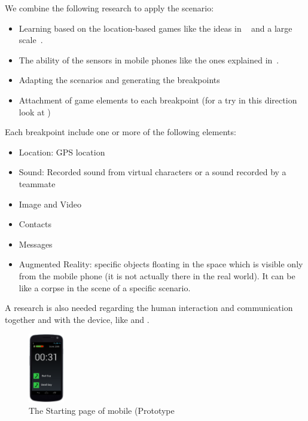 \documentclass[conference]{IEEEtran}
\begin{document}
We combine the following research to apply the scenario:
\begin{itemize}
\item Learning based on the location-based games like the ideas in ~\cite{rexplorer} and 
a large scale~\cite{scal-loc-g}.
\item The ability of the sensors in mobile phones like the ones explained in~\cite{sensors}.
\item Adapting the scenarios and generating the breakpoints
\item Attachment of game elements to each breakpoint (for a try in this direction 
look at \cite{totem})
\end{itemize}


Each breakpoint include one or more of the following elements:
\begin{itemize}
\item Location: GPS location
\item Sound: Recorded sound from virtual characters or a sound
recorded by a teammate
\item Image and Video
\item Contacts
\item Messages
\item Augmented Reality: specific objects floating in the space which is 
visible only from the mobile phone (it is not actually there in the real world).
It can be like a corpse in the scene of a specific scenario.
\end{itemize}


A research is also needed regarding the human interaction and communication
together and with the device, like \cite{behavior} and \cite{facial-vocal}.


\begin{figure}
 \centering
\includegraphics[width=0.14\textwidth]{kar}
\caption{The Starting page of mobile (Prototype}
\label{diagram}
\end{figure}




\end{document}
